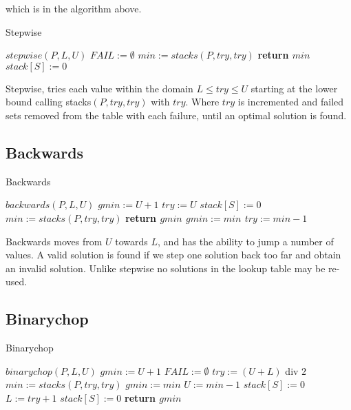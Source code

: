 which is in the algorithm above.

\begin{algorithm}[H]
\caption{Stepwise}
\label{alg4}
\begin{algorithmic}
\REQUIRE $stepwise(P,L,U)$
\STATE $FAIL := \emptyset$
\STATE $min := stacks(P,try,try)$
\STATE \bf return $min$
\ENDIF
\ENDFOR
{}
\STATE $stack[S] := 0$
\ENDFOR
\ENSURE
\end{algorithmic}
\end{algorithm}

Stepwise, tries each value within the domain $L \leq try \le U$ starting at the
lower bound calling stacks$(P,try,try)$ with $try$. Where $try$ is incremented
and failed sets removed from the table with each failure, until an optimal
solution is found.

\subsection{Backwards}

\begin{algorithm}[H]
\caption{Backwards}
\label{alg4}
\begin{algorithmic}
\REQUIRE $backwards(P,L,U)$
\STATE $gmin := U+1$
\STATE $try := U$
\STATE $stack[S] := 0$
\ENDFOR
{}
\STATE $min := stacks(P,try,try)$
\STATE \bf return $gmin$
\ENDIF
\STATE $gmin := min$
\STATE $try := min-1$
\ENDWHILE
\ENSURE
\end{algorithmic}
\end{algorithm}

Backwards moves from $U$ towards $L$, and has the ability to jump a number of
values. A valid solution is found if we step one solution back too far and
obtain an invalid solution.  Unlike stepwise no solutions in the lookup table
may be re-used.

\subsection{Binarychop}

\begin{algorithm}[H]
\caption{Binarychop}
\label{alg4}
\begin{algorithmic}
\REQUIRE $binarychop(P,L,U)$
\STATE $gmin := U+1$
\STATE $FAIL := \emptyset$
\STATE $try := (U+L)$ div $2$
\STATE $min := stacks(P,try,try)$
\STATE $gmin := min$
\STATE $U := min - 1$
\STATE $stack[S] := 0$
\ENDFOR
\ELSE
\STATE $L := try + 1$
\STATE $stack[S] := 0$
\ENDFOR
\ENDIF
\ENDWHILE
\STATE \bf return $gmin$
\ENSURE
\end{algorithmic}
\end{algorithm}

